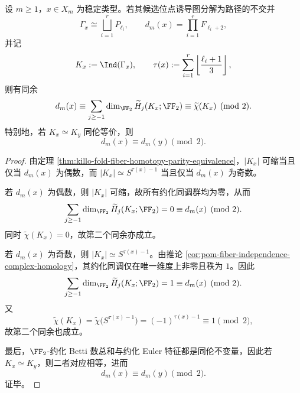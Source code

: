 \begin{proposition}\label{prop:xi-time-part62d-fiber-parity-f2-homotopy-fingerprint}
设 \(m\ge 1\)，\(x\in X_m\) 为稳定类型。若其候选位点诱导图分解为路径的不交并
\[
\Gamma_x\cong \bigsqcup_{i=1}^{r}P_{\ell_i},
\qquad
d_m(x)=\prod_{i=1}^{r}F_{\ell_i+2},
\]
并记
\[
K_x:=\Ind(\Gamma_x),
\qquad
\tau(x):=\sum_{i=1}^{r}\left\lfloor\frac{\ell_i+1}{3}\right\rfloor,
\]
则有同余
\[
d_m(x)\equiv
\sum_{j\ge -1}\dim_{\FF_2}\widetilde H_j(K_x;\FF_2)
\equiv
\widetilde\chi(K_x)
\pmod 2.
\]
特别地，若 \(K_x\simeq K_y\) 同伦等价，则
\[
d_m(x)\equiv d_m(y)\pmod 2.
\]
\end{proposition}
\begin{proof}
由定理 \ref{thm:killo-fold-fiber-homotopy-parity-equivalence}，\(|K_x|\) 可缩当且仅当 \(d_m(x)\) 为偶数，而 \(|K_x|\simeq S^{\tau(x)-1}\) 当且仅当 \(d_m(x)\) 为奇数。

若 \(d_m(x)\) 为偶数，则 \(|K_x|\) 可缩，故所有约化同调群均为零，从而
\[
\sum_{j\ge -1}\dim_{\FF_2}\widetilde H_j(K_x;\FF_2)=0
\equiv d_m(x)\pmod 2.
\]
同时 \(\widetilde\chi(K_x)=0\)，故第二个同余亦成立。

若 \(d_m(x)\) 为奇数，则 \(|K_x|\simeq S^{\tau(x)-1}\)。由推论 \ref{cor:pom-fiber-independence-complex-homology}，其约化同调仅在唯一维度上非零且秩为 \(1\)。因此
\[
\sum_{j\ge -1}\dim_{\FF_2}\widetilde H_j(K_x;\FF_2)=1
\equiv d_m(x)\pmod 2.
\]
又
\[
\widetilde\chi(K_x)=\widetilde\chi\!\bigl(S^{\tau(x)-1}\bigr)=(-1)^{\tau(x)-1}\equiv 1\pmod 2,
\]
故第二个同余也成立。

最后，\(\FF_2\)-约化 Betti 数总和与约化 Euler 特征都是同伦不变量，因此若 \(K_x\simeq K_y\)，则二者对应相等，进而
\[
d_m(x)\equiv d_m(y)\pmod 2.
\]
证毕。
\end{proof}

